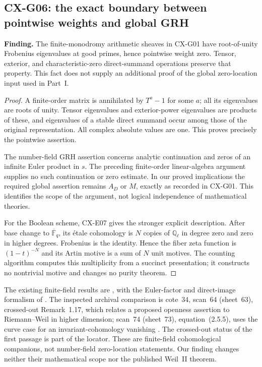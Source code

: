 \documentclass[11pt,a4paper]{article}
\begin{document}
\subsection{CX-G06: the exact boundary between pointwise weights and global GRH}
\label{finding:CX-G06}

\textbf{Finding.} The finite-monodromy arithmetic sheaves in CX-G01 have
root-of-unity Frobenius eigenvalues at good primes, hence pointwise weight
zero.  Tensor, exterior, and characteristic-zero direct-summand operations
preserve that property.  This fact does not supply an additional proof of
the global zero-location input used in Part~I.

\begin{proof}
A finite-order matrix is annihilated by $T^a-1$ for some $a$; all its
eigenvalues are roots of unity.  Tensor eigenvalues and exterior-power
eigenvalues are products of these, and eigenvalues of a stable direct
summand occur among those of the original representation.  All complex
absolute values are one.  This proves precisely the pointwise assertion.

The number-field GRH assertion concerns analytic continuation and zeros of
an infinite Euler product in $s$.  The preceding finite-order linear-algebra
argument supplies no such continuation or zero estimate.  In our proved
implications the required global assertion remains $A_D$ or $M$, exactly
as recorded in CX-G01.  This identifies the scope of the argument, not
logical independence of mathematical theories.

For the Boolean scheme, CX-E07 gives the stronger explicit description.
After base change to $\overline{\mathbb F}_q$, its étale cohomology is $N$
copies of $\mathbb Q_\ell$ in degree zero and zero in higher degrees.
Frobenius is the identity.  Hence the fiber zeta function is $(1-t)^{-N}$
and its Artin motive is a sum of $N$ unit motives.  The counting algorithm
computes this multiplicity from a succinct presentation; it constructs
no nontrivial motive and changes no purity theorem.
\end{proof}

The existing finite-field results are
\cite[\S1.2; Theorem~3.3.1, p.~204; Corollary~3.3.9, p.~207]{WeilII},
with the Euler-factor and direct-image formalism of
\cite[Exp.~XV \S3, no.~1 Proposition~1, and no.~2]{SGA5}.
The inspected archival comparison is cote~34, scan~64 (sheet~63),
crossed-out Remark~1.17, which relates a proposed openness assertion to
Riemann--Weil in higher dimension; scan~74 (sheet~73), equation~(2.5.5),
uses the curve case for an invariant-cohomology vanishing
\cite{Archive34}.  The crossed-out status of the first passage is part
of the locator.  These are finite-field cohomological companions, not
number-field zero-location statements.  Our finding changes neither
their mathematical scope nor the published Weil~II theorem.
\end{document}
